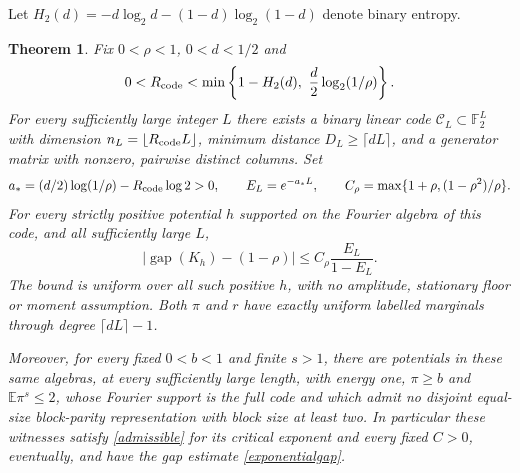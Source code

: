 \documentclass[11pt]{article}
\newcommand{\E}{\mathbb E}
\newcommand{\F}{\mathbb F}
\newtheorem{theorem}{Theorem}[section]
\begin{document}
Let $H_2(d)=-d\log_2d-(1-d)\log_2(1-d)$ denote binary entropy.
\begin{theorem}\label{positiverate}
Fix $0<\rho<1$, $0<d<1/2$ and
\begin{equation}\label{ratecondition}
 0<R_{\rm code}<\min\left\{1-H_2(d),\ \frac d2\log_2(1/\rho)\right\}.
\end{equation}
For every sufficiently large integer $L$ there exists a binary linear code $\mathcal C_L\subset\F_2^L$ with dimension $n_L=\lfloor R_{\rm code}L\rfloor$, minimum distance $D_L\geq\lceil dL\rceil$, and a generator matrix with nonzero, pairwise distinct columns. Set
\[
 a_*=(d/2)\log(1/\rho)-R_{\rm code}\log2>0,\qquad
 E_L=e^{-a_*L},\qquad
 C_\rho=\max\{1+\rho,(1-\rho^2)/\rho\}.
\]
For every strictly positive potential $h$ supported on the Fourier algebra of this code, and all sufficiently large $L$,
\begin{equation}\label{exponentialgap}
 \left|\operatorname{gap}(K_h)-(1-\rho)\right|
 \leq C_\rho\frac{E_L}{1-E_L}.
\end{equation}
The bound is uniform over all such positive $h$, with no amplitude, stationary floor or moment assumption. Both $\pi$ and $r$ have exactly uniform labelled marginals through degree $\lceil dL\rceil-1$.

Moreover, for every fixed $0<b<1$ and finite $s>1$, there are potentials in these same algebras, at every sufficiently large length, with energy one, $\pi\geq b$ and $\E\pi^s\leq2$, whose Fourier support is the full code and which admit no disjoint equal-size block-parity representation with block size at least two. In particular these witnesses satisfy \eqref{admissible} for its critical exponent and every fixed $C>0$, eventually, and have the gap estimate \eqref{exponentialgap}.
\end{theorem}
\end{document}
